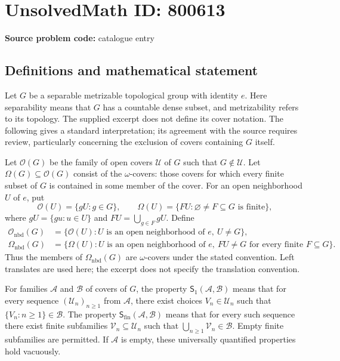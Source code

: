 \documentclass[11pt]{article}
\begin{document}
\section*{UnsolvedMath ID: 800613}
\textbf{Source problem code:} catalogue entry
\subsection{Definitions and mathematical statement}
Let \(G\) be a separable metrizable topological group with identity \(e\). Here separability means that \(G\) has a countable dense subset, and metrizability refers to its topology. The supplied excerpt does not define its cover notation. The following gives a standard interpretation; its agreement with the source requires review, particularly concerning the exclusion of covers containing \(G\) itself.

Let \(\mathcal O(G)\) be the family of open covers \(\mathcal U\) of \(G\) such that \(G\notin\mathcal U\). Let \(\Omega(G)\subseteq\mathcal O(G)\) consist of the \(\omega\)-covers: those covers for which every finite subset of \(G\) is contained in some member of the cover. For an open neighborhood \(U\) of \(e\), put
\[
\mathcal O(U)=\{gU:g\in G\},\qquad
\Omega(U)=\{FU:\varnothing\ne F\subseteq G\text{ is finite}\},
\]
where \(gU=\{gu:u\in U\}\) and \(FU=\bigcup_{g\in F}gU\). Define
\[
\begin{aligned}
\mathcal O_{\mathrm{nbd}}(G)
 &=\{\mathcal O(U):U\text{ is an open neighborhood of }e,\ U\ne G\},\\
\Omega_{\mathrm{nbd}}(G)
 &=\{\Omega(U):U\text{ is an open neighborhood of }e,
       \ FU\ne G\text{ for every finite }F\subseteq G\}.
\end{aligned}
\]
Thus the members of \(\Omega_{\mathrm{nbd}}(G)\) are \(\omega\)-covers under the stated convention. Left translates are used here; the excerpt does not specify the translation convention.

For families \(\mathcal A\) and \(\mathcal B\) of covers of \(G\), the property \(\mathsf S_1(\mathcal A,\mathcal B)\) means that for every sequence \((\mathcal U_n)_{n\ge1}\) from \(\mathcal A\), there exist choices \(V_n\in\mathcal U_n\) such that \(\{V_n:n\ge1\}\in\mathcal B\). The property \(\mathsf S_{\mathrm{fin}}(\mathcal A,\mathcal B)\) means that for every such sequence there exist finite subfamilies \(\mathcal V_n\subseteq\mathcal U_n\) such that \(\bigcup_{n\ge1}\mathcal V_n\in\mathcal B\). Empty finite subfamilies are permitted. If \(\mathcal A\) is empty, these universally quantified properties hold vacuously.
\end{document}
